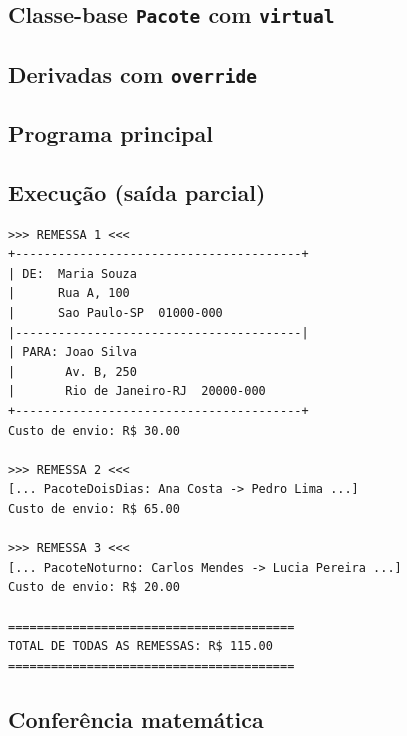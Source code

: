 \documentclass[11pt,a4paper]{article}
\begin{document}
\subsection*{Classe-base \texttt{Pacote} com \texttt{virtual}}




\subsection*{Derivadas com \texttt{override}}







\subsection*{Programa principal}



\subsection*{Execu\c{c}\~ao (sa\'ida parcial)}

\begin{saidabox}
\begin{lstlisting}[style=terminal]
>>> REMESSA 1 <<<
+----------------------------------------+
| DE:  Maria Souza
|      Rua A, 100
|      Sao Paulo-SP  01000-000
|----------------------------------------|
| PARA: Joao Silva
|       Av. B, 250
|       Rio de Janeiro-RJ  20000-000
+----------------------------------------+
Custo de envio: R$ 30.00

>>> REMESSA 2 <<<
[... PacoteDoisDias: Ana Costa -> Pedro Lima ...]
Custo de envio: R$ 65.00

>>> REMESSA 3 <<<
[... PacoteNoturno: Carlos Mendes -> Lucia Pereira ...]
Custo de envio: R$ 20.00

========================================
TOTAL DE TODAS AS REMESSAS: R$ 115.00
========================================
\end{lstlisting}
\end{saidabox}

\subsection*{Confer\^encia matem\'atica}
\end{document}
